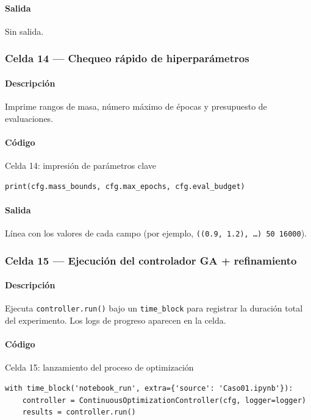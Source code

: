 \paragraph{Salida} Sin salida.

\subsubsection*{Celda 14 — Chequeo rápido de hiperparámetros}
\paragraph{Descripción} Imprime rangos de masa, número máximo de épocas y presupuesto de evaluaciones.
\paragraph{Código}
\begin{listing}[H]
\caption{Celda 14: impresión de parámetros clave}
\begin{adjustbox}{max width=\textwidth}
\begin{minipage}{\textwidth}
\begin{verbatim}
print(cfg.mass_bounds, cfg.max_epochs, cfg.eval_budget)
\end{verbatim}
\end{minipage}
\end{adjustbox}
\end{listing}
\paragraph{Salida} Línea con los valores de cada campo (por ejemplo, \texttt{((0.9, 1.2), \dots) 50 16000}).

\subsubsection*{Celda 15 — Ejecución del controlador GA + refinamiento}
\paragraph{Descripción} Ejecuta \texttt{controller.run()} bajo un \texttt{time\_block} para registrar la duración total del experimento. Los logs de progreso aparecen en la celda. %
\paragraph{Código}
\begin{listing}[H]
\caption{Celda 15: lanzamiento del proceso de optimización}
\begin{adjustbox}{max width=\textwidth}
\begin{minipage}{\textwidth}
\begin{verbatim}
with time_block('notebook_run', extra={'source': 'Caso01.ipynb'}):
    controller = ContinuousOptimizationController(cfg, logger=logger)
    results = controller.run()
\end{verbatim}
\end{minipage}
\end{adjustbox}
\end{listing}
